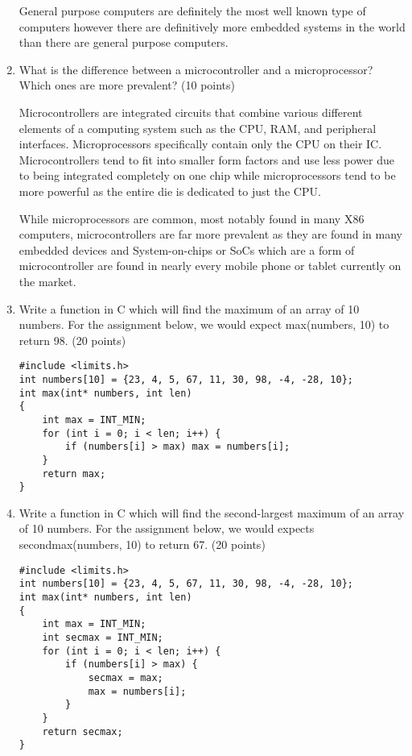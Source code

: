 \documentclass[12pt,letterpaper,titlepage]{article}
\begin{document}
\begin{enumerate}
General purpose computers are definitely the most well known type of computers however there are definitively more embedded systems in the world than there are general purpose computers.

\clearpage

\item What is the difference between a microcontroller and a microprocessor? Which ones are more prevalent? (10 points)

Microcontrollers are integrated circuits that combine various different elements of a computing system such as the CPU, RAM, and peripheral interfaces. Microprocessors specifically contain only the CPU on their IC. Microcontrollers tend to fit into smaller form factors and use less power due to being integrated completely on one chip while microprocessors tend to be more powerful as the entire die is dedicated to just the CPU. 

While microprocessors are common, most notably found in many X86 computers, microcontrollers are far more prevalent as they are found in many embedded devices and System-on-chips or SoCs which are a form of microcontroller are found in nearly every mobile phone or tablet currently on the market.

\item Write a function in C which will find the maximum of an array of 10 numbers. For the assignment below, we would expect max(numbers, 10) to return 98. (20 points)
\begin{lstlisting}
#include <limits.h>
int numbers[10] = {23, 4, 5, 67, 11, 30, 98, -4, -28, 10};
int max(int* numbers, int len) 
{
	int max = INT_MIN;
	for (int i = 0; i < len; i++) {
		if (numbers[i] > max) max = numbers[i];
	}
	return max;
}
\end{lstlisting}

\item Write a function in C which will find the second-largest maximum of an array of 10 numbers. For the assignment below, we would expects secondmax(numbers, 10) to return 67. (20 points)

\begin{lstlisting}
#include <limits.h>
int numbers[10] = {23, 4, 5, 67, 11, 30, 98, -4, -28, 10};
int max(int* numbers, int len) 
{
	int max = INT_MIN;
	int secmax = INT_MIN;
	for (int i = 0; i < len; i++) {
		if (numbers[i] > max) {
		    secmax = max;
		    max = numbers[i];
		}
	}
	return secmax;
}
\end{lstlisting}

\end{enumerate}


\begin{raggedright}



\end{raggedright}
\end{document}
